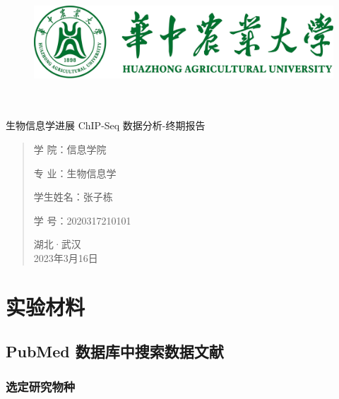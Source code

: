 \documentclass[UTF8]{ctexart}
\date{}
\begin{document}
\thispagestyle{empty}
\begin{figure}[t]
	\centering
	\includegraphics[scale=0.7]{img/HZAU.png}
\end{figure}

\begin{center}
	\quad \\
	\quad \\
	\heiti \fontsize{45}{17} 生物信息学进展
	\vskip 3.5cm
	\heiti {} ChIP-Seq 数据分析-终期报告
\end{center}
\vskip 3.5cm

\begin{quotation}
	\heiti \fontsize{15}{15}
	\doublespacing
	\par\setlength\parindent{12em}
	\quad

	学\hspace{0.61cm} 院：信息学院

	专\hspace{0.61cm} 业：生物信息学

	学生姓名：张子栋

	学\hspace{0.61cm} 号：2020317210101

	\vskip 2cm
	\centering
	湖北·武汉\\
	2023年3月16日
\end{quotation}

\clearpage
\thispagestyle{empty}
\quad

\clearpage

\thispagestyle{empty}
\tableofcontents
\setcounter{page}{0}

\clearpage

\section{实验材料}

\subsection{PubMed 数据库中搜索数据文献}

\subsubsection{选定研究物种}
\end{document}
